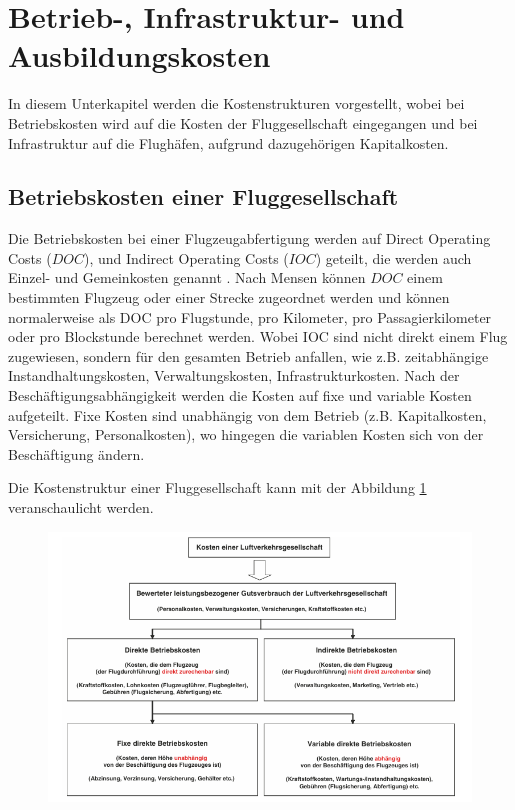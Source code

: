\section{Betrieb-, Infrastruktur- und Ausbildungskosten}
\label{s:Kosten}
In diesem Unterkapitel werden die Kostenstrukturen vorgestellt, wobei bei Betriebskosten wird auf die Kosten der Fluggesellschaft
eingegangen und bei Infrastruktur auf die Flughäfen, aufgrund dazugehörigen Kapitalkosten.

\subsection{Betriebskosten einer Fluggesellschaft}

Die Betriebskosten bei einer Flugzeugabfertigung werden auf Direct Operating Costs ($DOC$), und Indirect Operating Costs 
($IOC$) geteilt, die werden auch Einzel- und Gemeinkosten genannt \cite{conrady2019luftverkehr}. 
Nach Mensen \cite{mensen2013handbuch} können $DOC$ einem bestimmten Flugzeug oder einer Strecke zugeordnet 
werden und können normalerweise als DOC pro Flugstunde, pro Kilometer, pro Passagierkilometer oder pro Blockstunde 
berechnet werden. Wobei IOC sind nicht direkt einem Flug zugewiesen, sondern für den gesamten Betrieb anfallen, wie z.B. zeitabhängige 
Instandhaltungskosten, Verwaltungskosten, Infrastrukturkosten. Nach der Beschäftigungsabhängigkeit werden die Kosten auf fixe und variable Kosten aufgeteilt. 
Fixe Kosten sind unabhängig von dem Betrieb (z.B. Kapitalkosten, Versicherung, Personalkosten), wo hingegen die variablen Kosten sich 
von der Beschäftigung ändern.

Die Kostenstruktur einer Fluggesellschaft kann mit der Abbildung \ref{doc} veranschaulicht werden.

\begin{figure}[h]
	\centering
	\includegraphics[width=0.9\linewidth]{Bilder/Systematik der DOC_Berechnung.png}
	\caption[DOC]{ \cite{mensen2013handbuch}}
	\label{doc}
\end{figure}

